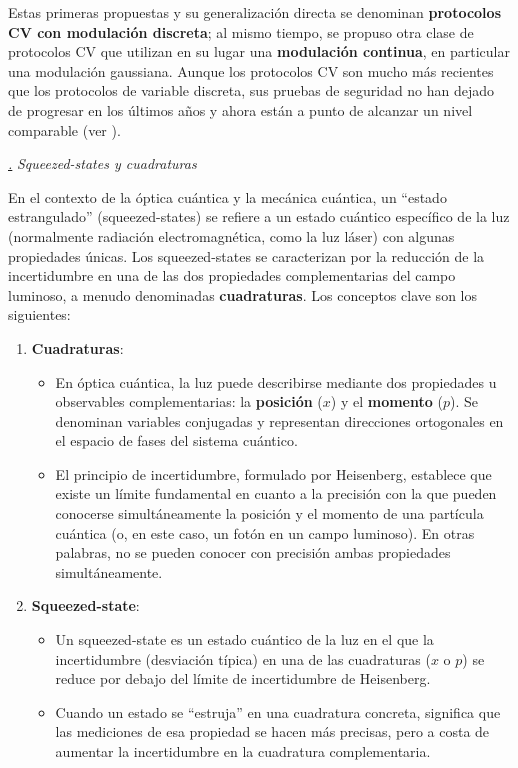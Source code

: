 \documentclass[a4paper,11pt]{book} %
\numberwithin{equation}{chapter}
\def\subsubiContadorIt{\par\addtocounter{subsubsection}{1}\underline{\it\thesubsubsection.}\hskip0.5cm \setcounter{subsubsubsectionIt}{0}}
\newcommand{\SubsubiIt}[1]{
		\subsubiContadorIt \textit{#1}
	}
\newcounter{subsubsubsectionIt}[subsubsection]
\begin{document}
Estas primeras propuestas y su generalización directa se denominan \textbf{protocolos CV con modulación discreta}; al mismo tiempo, se propuso otra clase de protocolos CV que utilizan en su lugar una \textbf{modulación continua}, en particular una modulación gaussiana. Aunque los protocolos CV son mucho más recientes que los protocolos de variable discreta, sus pruebas de seguridad no han dejado de progresar en los últimos años y ahora están a punto de alcanzar un nivel comparable (ver \cite{QKD_resumen}).

		\SubsubiIt{Squeezed-states y cuadraturas}
		
En el contexto de la óptica cuántica y la mecánica cuántica, un ``estado estrangulado'' (squeezed-states) se refiere a un estado cuántico específico de la luz (normalmente radiación electromagnética, como la luz láser) con algunas propiedades únicas. Los squeezed-states se caracterizan por la reducción de la incertidumbre en una de las dos propiedades complementarias del campo luminoso, a menudo denominadas \textbf{cuadraturas}. Los conceptos clave son los siguientes: 
\begin{enumerate}
	\item \textbf{Cuadraturas}: 
	\begin{itemize}
		\item En óptica cuántica, la luz puede describirse mediante dos propiedades u observables complementarias: la \textbf{posición} ($x$) y el \textbf{momento} ($p$). Se denominan variables conjugadas y representan direcciones ortogonales en el espacio de fases del sistema cuántico.
		\item El principio de incertidumbre, formulado por Heisenberg, establece que existe un límite fundamental en cuanto a la precisión con la que pueden conocerse simultáneamente la posición y el momento de una partícula cuántica (o, en este caso, un fotón en un campo luminoso). En otras palabras, no se pueden conocer con precisión ambas propiedades simultáneamente.
	\end{itemize}

	\item \textbf{Squeezed-state}: 
	\begin{itemize}
		\item Un squeezed-state es un estado cuántico de la luz en el que la incertidumbre (desviación típica) en una de las cuadraturas ($x$ o $p$) se reduce por debajo del límite de incertidumbre de Heisenberg.
   		\item Cuando un estado se ``estruja'' en una cuadratura concreta, significa que las mediciones de esa propiedad se hacen más precisas, pero a costa de aumentar la incertidumbre en la cuadratura complementaria.
	\end{itemize}
	
\end{enumerate}
\end{document}
